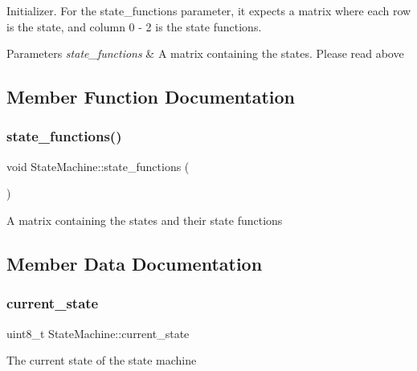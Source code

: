 Initializer. For the state\+\_\+functions parameter, it expects a matrix where each row is the state, and column 0 -\/ 2 is the state functions. 
\begin{DoxyParams}{Parameters}
{\em state\+\_\+functions} & A matrix containing the states. Please read above \\
\hline
\end{DoxyParams}


\subsection{Member Function Documentation}
\hypertarget{class_state_machine_acc87359cd98c436f5b891ffe6cb67160}{}\label{class_state_machine_acc87359cd98c436f5b891ffe6cb67160} 
\subsubsection{\texorpdfstring{state\+\_\+functions()}{state\_functions()}}
{\footnotesize\ttfamily void State\+Machine\+::state\+\_\+functions (\begin{DoxyParamCaption}{ }\end{DoxyParamCaption})\hspace{0.3cm}{\ttfamily [private]}}

A matrix containing the states and their state functions 

\subsection{Member Data Documentation}
\hypertarget{class_state_machine_abdcd9426d9a2ec9e2d703c74cd3299df}{}\label{class_state_machine_abdcd9426d9a2ec9e2d703c74cd3299df} 
\subsubsection{\texorpdfstring{current\+\_\+state}{current\_state}}
{\footnotesize\ttfamily uint8\+\_\+t State\+Machine\+::current\+\_\+state}

The current state of the state machine \hypertarget{class_state_machine_adc6939485a12a6250df3cc65aa172d2a}{}\label{class_state_machine_adc6939485a12a6250df3cc65aa172d2a} 
